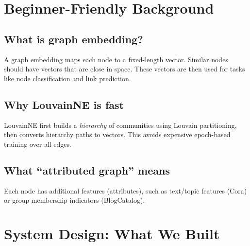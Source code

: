 \documentclass[10pt,twoside,twocolumn]{article}
\begin{document}
\section{Beginner-Friendly Background}
\subsection{What is graph embedding?}
A graph embedding maps each node to a fixed-length vector. Similar nodes should have vectors that are close in space. These vectors are then used for tasks like node classification and link prediction.

\subsection{Why LouvainNE is fast}
LouvainNE first builds a \emph{hierarchy} of communities using Louvain partitioning, then converts hierarchy paths to vectors. This avoids expensive epoch-based training over all edges.

\subsection{What ``attributed graph'' means}
Each node has additional features (attributes), such as text/topic features (Cora) or group-membership indicators (BlogCatalog).

\section{System Design: What We Built}
\end{document}
